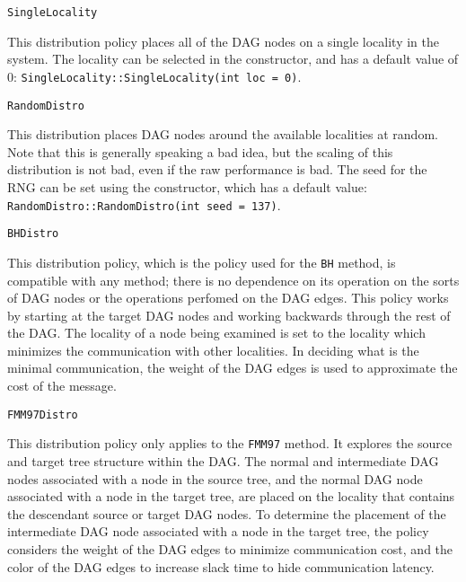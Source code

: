 \begin{lstlisting}
SingleLocality
\end{lstlisting}


This distribution policy places all of the DAG nodes on a single locality in
the system. The locality can be selected in the constructor, and has a default
value of 0: \texttt{SingleLocality::SingleLocality(int loc = 0)}.

\begin{lstlisting}
RandomDistro
\end{lstlisting}


This distribution places DAG nodes around the available localities at random.
Note that this is generally speaking a bad idea, but the scaling of this
distribution is not bad, even if the raw performance is bad. The seed for the
RNG can be set using the constructor, which has a default value:
\texttt{RandomDistro::RandomDistro(int seed = 137)}.

\begin{lstlisting}
BHDistro
\end{lstlisting}


This distribution policy, which is the policy used for the \texttt{BH} method,
is compatible with any method; there is no dependence on its operation on the
sorts of DAG nodes or the operations perfomed on the DAG edges. This policy
works by starting at the target DAG nodes and working backwards through the
rest of the DAG. The locality of a node being examined is set to the locality
which minimizes the communication with other localities. In deciding what is
the minimal communication, the weight of the DAG edges is used to approximate
the cost of the message.

\begin{lstlisting}
FMM97Distro
\end{lstlisting}


This distribution policy only applies to the \texttt{FMM97} method. It explores
the source and target tree structure within the DAG. The normal and intermediate
DAG nodes associated with a node in the source tree, and the normal DAG node
associated with a node in the target tree, are placed on the locality that
contains the descendant source or target DAG nodes. To determine the placement
of the intermediate DAG node associated with a node in the target tree, the
policy considers the weight of the DAG edges to minimize communication cost, and
the color of the DAG edges to increase slack time to hide communication
latency.

